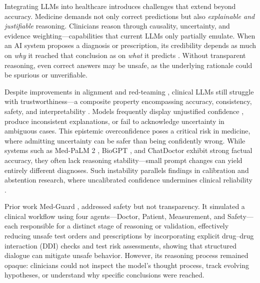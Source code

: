 \documentclass[letterpaper]{article} %
\begin{document}
Integrating LLMs into healthcare introduces challenges that extend beyond accuracy. Medicine demands not only correct predictions but also \emph{explainable and justifiable} reasoning. Clinicians reason through causality, uncertainty, and evidence weighting—capabilities that current LLMs only partially emulate. When an AI system proposes a diagnosis or prescription, its credibility depends as much on \emph{why} it reached that conclusion as on \emph{what} it predicts \cite{tonekaboni2019clinicians,amann2020explainability}. Without transparent reasoning, even correct answers may be unsafe, as the underlying rationale could be spurious or unverifiable.

Despite improvements in alignment and red-teaming \cite{mei2023assert}, clinical LLMs still struggle with trustworthiness—a composite property encompassing accuracy, consistency, safety, and interpretability \cite{a2019,huang2025survey}. Models frequently display unjustified confidence \cite{kadavath2022language}, produce inconsistent explanations, or fail to acknowledge uncertainty in ambiguous cases. This epistemic overconfidence poses a critical risk in medicine, where admitting uncertainty can be safer than being confidently wrong. While systems such as Med-PaLM 2 \cite{singhal2025toward}, BioGPT \cite{luo2022biogpt}, and ChatDoctor \cite{li2023chatdoctor} exhibit strong factual accuracy, they often lack reasoning stability—small prompt changes can yield entirely different diagnoses. Such instability parallels findings in calibration and abstention research, where uncalibrated confidence undermines clinical reliability \cite{guo2017calibration,malinin2020uncertainty}.


Prior work Med-Guard \cite{jain2025medguard}, addressed safety but not transparency. It simulated a clinical workflow using four agents—Doctor, Patient, Measurement, and Safety—each responsible for a distinct stage of reasoning or validation, effectively reducing unsafe test orders and prescriptions by incorporating explicit drug–drug interaction (DDI) checks and test risk assessments, showing that structured dialogue can mitigate unsafe behavior. However, its reasoning process remained opaque: clinicians could not inspect the model’s thought process, track evolving hypotheses, or understand why specific conclusions were reached.
\end{document}
